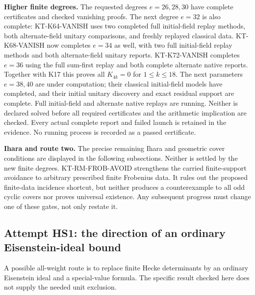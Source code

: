 \documentclass[11pt,a4paper]{article}
\theoremstyle{definition}
\renewcommand{\paragraph}[1]{\par\smallskip\noindent\textbf{#1}\quad\ignorespaces}
\begin{document}
\paragraph{Higher finite degrees.}
The requested degrees $e=26,28,30$ have complete certificates and
checked vanishing proofs. The next degree $e=32$ is also complete:
KT-K64-VANISH uses two completed full initial-field replay methods,
both alternate-field unitary comparisons, and freshly replayed
classical data. KT-K68-VANISH now completes $e=34$ as well,
with two full initial-field replay methods and both alternate-field
unitary reports. KT-K72-VANISH completes $e=36$ using the full
sum-first replay and both complete alternate native reports.
Together with K17 this proves all $K_{4k}=0$ for
$1\le k\le18$. The next parameters $e=38,40$ are under
computation; their classical initial-field models have completed,
and their initial unitary discovery and exact residual support
are complete. Full initial-field and alternate native replays
are running. Neither is declared
solved before all required certificates and the arithmetic
implication are checked.
Every actual complete report and failed launch is retained in the
evidence. No running process is recorded as a passed certificate.

\paragraph{Ihara and route two.}
The precise remaining Ihara and geometric cover conditions
are displayed in the following subsections. Neither is
settled by the new finite degrees. KT-RM-FROB-AVOID strengthens
the carried finite-support avoidance to arbitrary prescribed
finite Frobenius data. It rules out the proposed finite-data
incidence shortcut, but neither produces a counterexample to
all odd cyclic covers nor proves universal existence.
Any subsequent progress
must change one of these gates, not only restate it.



\subsection{Attempt HS1: the direction of an ordinary Eisenstein-ideal bound}

A possible all-weight route is to replace finite Hecke determinants
by an ordinary Eisenstein ideal and a special-value formula. The
specific result checked here does not supply the needed unit
exclusion.
\end{document}
